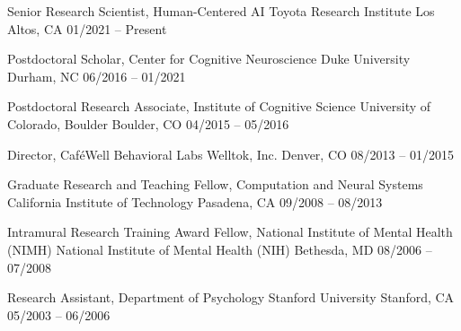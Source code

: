 \begin{cventries}
  \cventry
    {Senior Research Scientist, Human-Centered AI}
    {Toyota Research Institute}
    {Los Altos, CA}
    {01/2021 -- Present}
    {}

  \cventry
    {Postdoctoral Scholar, Center for Cognitive Neuroscience}
    {Duke University}
    {Durham, NC}
    {06/2016 -- 01/2021}
    {}

  \cventry
    {Postdoctoral Research Associate, Institute of Cognitive Science}
    {University of Colorado, Boulder}
    {Boulder, CO}
    {04/2015 -- 05/2016}
    {}

  \cventry
    {Director, CaféWell Behavioral Labs}
    {Welltok, Inc.}
    {Denver, CO}
    {08/2013 -- 01/2015}
    {}

  \cventry
    {Graduate Research and Teaching Fellow, Computation and Neural Systems}
    {California Institute of Technology}
    {Pasadena, CA}
    {09/2008 -- 08/2013}
    {}

  \cventry
    {Intramural Research Training Award Fellow, National Institute of Mental Health (NIMH)}
    {National Institute of Mental Health (NIH)}
    {Bethesda, MD}
    {08/2006 -- 07/2008}
    {}

  \cventry
    {Research Assistant, Department of Psychology}
    {Stanford University}
    {Stanford, CA}
    {05/2003 -- 06/2006}
    {}
\end{cventries}